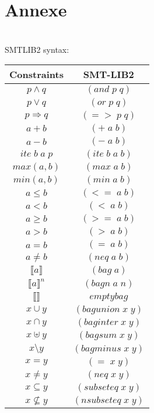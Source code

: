 
\section{Annexe}

\\SMTLIB2 syntax:
\\
\begin{tabular}{|c|c}
  \hline
  Constraints & SMT-LIB2 \\
  \hline
  $p\wedge q$ & $(and \;p \;q)$ \\
  \hline
  $p\vee q$ & $(or \;p \;q)$ \\
  \hline
  $p\Rightarrow q$ & $(=> \;p \;q)$ \\
  \hline
  $a+b$ & $(+\;a\;b)$ \\
  \hline
  $a-b$ & $(-\;a\;b)$ \\
  \hline
  $ite\; b\; a\; p$ & $(ite\;b\;a\;b)$ \\
  \hline
  $max(a,b)$ & $(max\;a\;b)$ \\
  \hline
  $min(a,b)$ & $(min\;a\;b)$ \\
  \hline
  $a\leq b$ & $(<= \;a\;b)$ \\
  \hline
  $a < b$ & $(< \;a\;b)$ \\
  \hline
  $a\geq b$ & $(>= \;a\;b)$ \\
  \hline
  $a > b$ & $(> \;a\;b)$ \\
  \hline
  $a = b$ & $(= \;a\;b)$ \\
  \hline
  $a\neq b$ & $(neq \;a\;b)$ \\
  \hline
  $\llbracket a \rrbracket$ & $(bag \;a)$ \\
  \hline
  $\llbracket a \rrbracket^{n}$ & $(bagn \;a \;n)$ \\
  \hline
  $\llbracket \rrbracket$ & $emptybag$ \\
  \hline
  $x \cup y$ & $(bagunion \;x \;y)$ \\
  \hline
  $x \cap y$ & $(baginter \;x \;y)$ \\
  \hline
  $x \uplus y$ & $(bagsum \;x \;y)$ \\
  \hline
  $x \setminus y$ & $(bagminus \;x \;y)$ \\
  \hline
  $x = y$ & $(= \;x \;y)$ \\
  \hline
  $x \neq y$ & $(neq \;x \;y)$ \\
  \hline
  $x \subseteq y$ & $(subseteq \;x \;y)$ \\
  \hline
  $x \nsubseteq y$ & $(nsubseteq \;x \;y)$ \\

\end{tabular}

